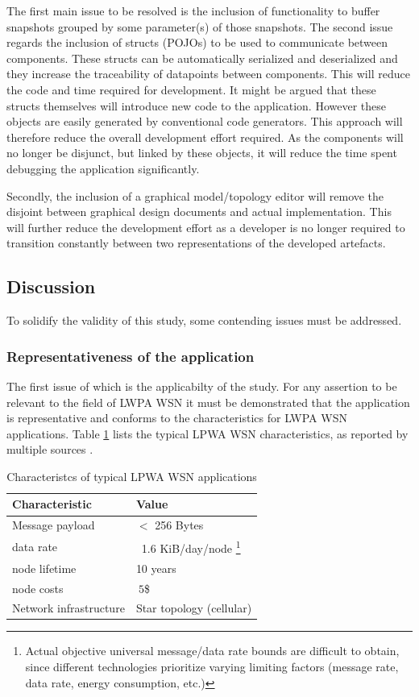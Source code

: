 The first main issue to be resolved is the inclusion of functionality to buffer snapshots grouped by some parameter(s) of those snapshots. The second issue regards the inclusion of structs (POJOs) to be used to communicate between components. These structs can be automatically serialized and deserialized and they increase the traceability of datapoints between components. This will reduce the code and time required for development. It might be argued that these structs themselves will introduce new code to the application. However these objects are easily generated by conventional code generators. This approach will therefore reduce the overall development effort required. As the components will no longer be disjunct, but linked by these objects, it will reduce the time spent debugging the application significantly.

Secondly, the inclusion of a graphical model/topology editor will remove the disjoint between graphical design documents and actual implementation. This will further reduce the development effort as a developer is no longer required to transition constantly between two representations of the developed artefacts.

\subsection{Discussion}
To solidify the validity of this study, some contending issues must be addressed. 

\subsubsection{Representativeness of the \sensit application}
The first issue of which is the applicabilty of the study. For any assertion to be relevant to the field of LWPA WSN it must be demonstrated that the \sensit application is representative and conforms to the characteristics for LWPA WSN applications. Table \ref{table:lpwa-chars} lists the typical LPWA WSN characteristics, as reported by multiple sources \cite{lora-vs-sigfox-boek, lora-vs-sigfox-whitepaper, lora-vs-nbiot-vs-sigfox, lora-vs-sigfox, whitepaper-tmobile, nbiot}.

\begin{table}
\centering
\begin{tabular}{|l|l|}\hline
Characteristic & Value \\ \hline
Message payload & $<$ 256 Bytes	\\ \hline
data rate &	~1.6 KiB/day/node \footnote{Actual objective universal message/data rate bounds are difficult to obtain, since different technologies prioritize varying limiting factors (message rate, data rate, energy consumption, etc.)}  \\ \hline
node lifetime & 10 years \\ \hline
node costs & $~5$\$ \\ \hline
Network infrastructure & Star topology (cellular)	\\ \hline
\end{tabular}
\caption{Characteristcs of typical LPWA WSN applications}
\label{table:lpwa-chars}
\end{table}

